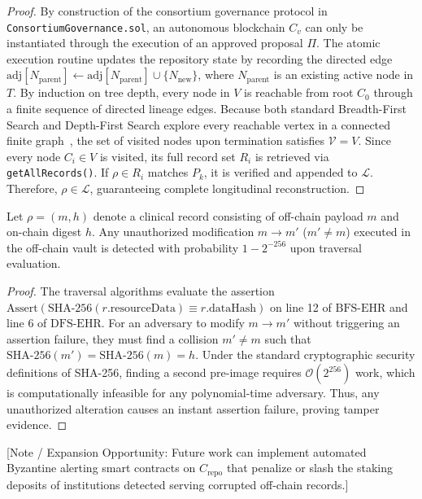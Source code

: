 \begin{proof}
By construction of the consortium governance protocol in \texttt{ConsortiumGovernance.sol}, an autonomous blockchain $C_v$ can only be instantiated through the execution of an approved proposal $\Pi$. The atomic execution routine updates the repository state by recording the directed edge $\text{adj}[N_{\text{parent}}] \leftarrow \text{adj}[N_{\text{parent}}] \cup \{N_{\text{new}}\}$, where $N_{\text{parent}}$ is an existing active node in $T$. By induction on tree depth, every node in $V$ is reachable from root $C_0$ through a finite sequence of directed lineage edges. Because both standard Breadth-First Search and Depth-First Search explore every reachable vertex in a connected finite graph~\cite{cormen2022introduction}, the set of visited nodes upon termination satisfies $\mathcal{V} = V$. Since every node $C_i \in V$ is visited, its full record set $R_i$ is retrieved via \texttt{getAllRecords()}. If $\rho \in R_i$ matches $P_k$, it is verified and appended to $\mathcal{L}$. Therefore, $\rho \in \mathcal{L}$, guaranteeing complete longitudinal reconstruction.
\end{proof}

\begin{theorem}
\label{thm:tamper_invariant}
Let $\rho = (m, h)$ denote a clinical record consisting of off-chain payload $m$ and on-chain digest $h$. Any unauthorized modification $m \to m'$ ($m' \neq m$) executed in the off-chain vault is detected with probability $1 - 2^{-256}$ upon traversal evaluation.
\end{theorem}

\begin{proof}
The traversal algorithms evaluate the assertion $\text{Assert}(\text{SHA-256}(r.\text{resourceData}) \equiv r.\text{dataHash})$ on line 12 of $\text{BFS-EHR}$ and line 6 of $\text{DFS-EHR}$. For an adversary to modify $m \to m'$ without triggering an assertion failure, they must find a collision $m' \neq m$ such that $\text{SHA-256}(m') = \text{SHA-256}(m) = h$. Under the standard cryptographic security definitions of SHA-256, finding a second pre-image requires $\mathcal{O}(2^{256})$ work, which is computationally infeasible for any polynomial-time adversary. Thus, any unauthorized alteration causes an instant assertion failure, proving tamper evidence.
\end{proof}

[Note / Expansion Opportunity: Future work can implement automated Byzantine alerting smart contracts on $C_{\text{repo}}$ that penalize or slash the staking deposits of institutions detected serving corrupted off-chain records.]
